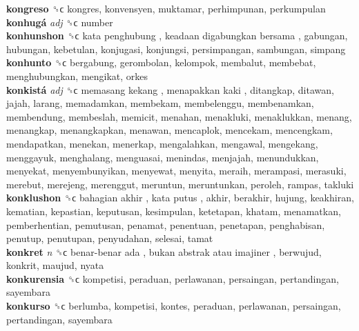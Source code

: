 \textbf{kongreso} ␝ϲ  kongres, konvensyen, muktamar, perhimpunan, perkumpulan  \\
\textbf{konhugá} \emph{adj}  ␝ϲ  number  \\
\textbf{konhunshon} ␝ϲ   kata penghubung ,  keadaan digabungkan bersama , gabungan, hubungan, kebetulan, konjugasi, konjungsi, persimpangan, sambungan, simpang  \\
\textbf{konhunto} ␝ϲ  bergabung, gerombolan, kelompok, membalut, membebat, menghubungkan, mengikat, orkes  \\
\textbf{konkistá} \emph{adj}  ␝ϲ   memasang kekang ,  menapakkan kaki , ditangkap, ditawan, jajah, larang, memadamkan, membekam, membelenggu, membenamkan, membendung, membeslah, memicit, menahan, menakluki, menaklukkan, menang, menangkap, menangkapkan, menawan, mencaplok, mencekam, mencengkam, mendapatkan, menekan, menerkap, mengalahkan, mengawal, mengekang, menggayuk, menghalang, menguasai, menindas, menjajah, menundukkan, menyekat, menyembunyikan, menyewat, menyita, meraih, merampasi, merasuki, merebut, merejeng, merenggut, meruntun, meruntunkan, peroleh, rampas, takluki  \\
\textbf{konklushon} ␝ϲ   bahagian akhir ,  kata putus , akhir, berakhir, hujung, keakhiran, kematian, kepastian, keputusan, kesimpulan, ketetapan, khatam, menamatkan, pemberhentian, pemutusan, penamat, penentuan, penetapan, penghabisan, penutup, penutupan, penyudahan, selesai, tamat  \\
\textbf{konkret} \emph{n}  ␝ϲ   benar-benar ada ,  bukan abstrak atau imajiner , berwujud, konkrit, maujud, nyata  \\
\textbf{konkurensia} ␝ϲ  kompetisi, peraduan, perlawanan, persaingan, pertandingan, sayembara  \\
\textbf{konkurso} ␝ϲ  berlumba, kompetisi, kontes, peraduan, perlawanan, persaingan, pertandingan, sayembara  \\
